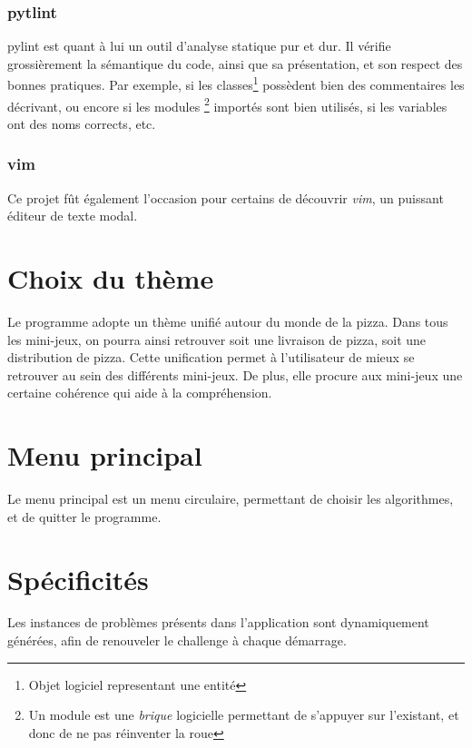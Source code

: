         \subsubsection{pytlint} pylint est quant à lui un outil d'analyse
            statique pur et dur. Il vérifie grossièrement la sémantique du code,
            ainsi que sa présentation, et son respect des bonnes pratiques.
            Par exemple, si les classes\footnote{Objet logiciel representant une entité}
            possèdent bien des commentaires les décrivant, ou encore si les modules
            \footnote{Un module est une \emph{brique} logicielle permettant
            de s'appuyer sur l'existant, et donc de ne pas réinventer la roue}
            importés sont bien utilisés, si les variables ont des noms corrects, etc.
        \subsubsection{vim}
            Ce projet fût également l'occasion pour certains de découvrir \emph{vim},
            un puissant éditeur de texte modal.

\section{Choix du thème}
    Le programme adopte un thème unifié autour du monde de la pizza. Dans tous les mini-jeux, on pourra
    ainsi retrouver soit une livraison de pizza, soit une distribution de pizza. Cette unification permet à
    l'utilisateur de mieux se retrouver au sein des différents mini-jeux. De plus, elle procure aux mini-jeux
    une certaine cohérence qui aide à la compréhension.

\section{Menu principal}
    Le menu principal est un menu circulaire,
    permettant de choisir les algorithmes, et de
    quitter le programme.

\section{Spécificités} %
    Les instances de problèmes présents dans l'application
    sont dynamiquement générées, afin de renouveler
    le challenge à chaque démarrage.
